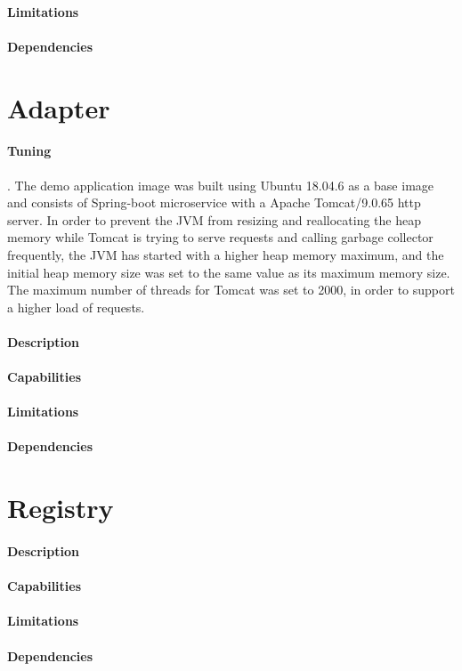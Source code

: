 \paragraph{Limitations}
\paragraph{Dependencies}

\section{Adapter} %
\label{sec:adapter}

\paragraph{Tuning}. The demo application image was built using Ubuntu 18.04.6 as a base image and consists of Spring-boot microservice with a Apache Tomcat/9.0.65 http server.
In order to prevent the JVM from resizing and reallocating the heap memory while Tomcat is trying to serve requests and
calling garbage collector frequently, the JVM has started with a higher heap memory maximum, and the initial heap memory
size was set to the same value as its maximum memory size.
The maximum number of threads for Tomcat was set to 2000, in order to support a higher load of requests.

\paragraph{Description}
\paragraph{Capabilities}
\paragraph{Limitations}
\paragraph{Dependencies}

\section{Registry} %
\label{sec:registry}

\paragraph{Description}
\paragraph{Capabilities}
\paragraph{Limitations}
\paragraph{Dependencies}
